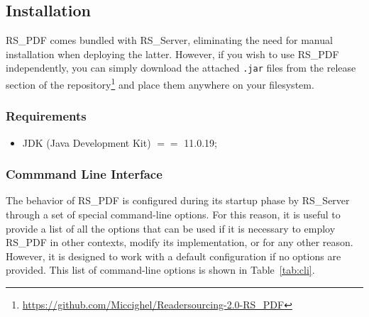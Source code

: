 \documentclass[a4paper, english]{article}
\newcommand{\rsserver}{RS\_Server\xspace}
\newcommand{\rspdf}{RS\_PDF\xspace}
\begin{document}
\subsection{Installation}

\rspdf comes bundled with \rsserver, eliminating the need for manual installation when deploying the latter. However, if you wish to use \rspdf 
independently, you can simply download the attached \verb|.jar| files from the release section of the repository\footnote{\url{https://github.com/Miccighel/Readersourcing-2.0-RS_PDF}} and place them anywhere on your filesystem.

\subsubsection{Requirements}

\begin{itemize}
\item JDK (Java Development Kit) $==$ 11.0.19;
\end{itemize}

\subsubsection{Commmand Line Interface}

The behavior of \rspdf is configured during its startup phase by \rsserver through a set of special command-line options. For this reason, it is useful to provide a list of all the options that can be used if it is necessary to employ \rspdf in other contexts, modify its implementation, or for any other reason. However, it is designed to work with a default configuration if no options are provided. This list of command-line options is shown in Table~\ref{tab:cli}.
\end{document}
